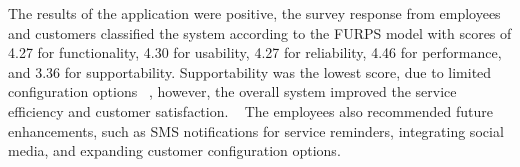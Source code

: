 




The results of the application were positive, the survey response from employees and customers classified the system according to the \ac{FURPS} model with scores of 4.27 for functionality, 4.30 for usability, 4.27 for reliability, 4.46 for performance, and 3.36 for supportability.
Supportability was the lowest score, due to limited configuration options ~\cite{MAS_MOTORS}, however, the overall system improved the service efficiency and customer satisfaction. ~\cite{MAS_MOTORS}
The employees also recommended future enhancements, such as SMS notifications for service reminders, integrating social media, and expanding customer configuration options.

